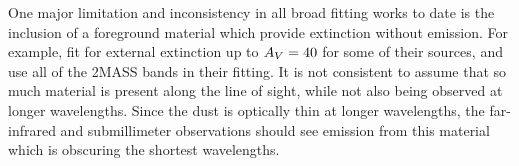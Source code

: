 %
%

One major limitation and inconsistency in all broad fitting works to date is the inclusion of a foreground material which provide extinction without emission. For example, \citet{Furlan:2016df} fit for external extinction up to $A_V = 40$ for some of their sources, and use all of the 2MASS bands in their fitting. It is not consistent to assume that so much material is present along the line of sight, while not also being observed at longer wavelengths. Since the dust is optically thin at longer wavelengths, the far-infrared and submillimeter observations should see emission from this material which is obscuring the shortest wavelengths.


